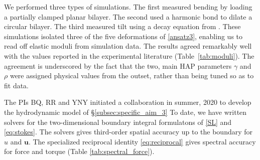 We performed three types of simulations. The first measured bending by loading
a partially clamped planar bilayer. The second used a harmonic bond to dilate a circular bilayer.
The third measured tilt using a decay equation from  \cite{KUZMIN2005}.
These simulations isolated three of the five deformations of \eqref{ansatz3}, enabling
us to read off elastic moduli from simulation data. The results agreed remarkably 
well with the values reported in the experimental literature 
(Table~\ref{tab:moduli}). The agreement is underscored by the fact
that the two, main HAP parameters $\gamma$ and $\rho$ were assigned
physical values from the outset, rather than being tuned so as to fit data. 

The PIs BQ, RR and YNY initiated a collaboration in summer, 2020 to develop
the hydrodynamic model of \S \ref{subsec:specific_aim_3}
To date, we have written solvers for the two-dimensional boundary integral formulatons
of \eqref{SL} and \eqref{eq:stokes}. The solvers gives third-order spatial accuracy
up to the boundary for $u$ and $\mathbf{u}$. The specialized reciprocal identity \ref{eq:reciprocal}
gives spectral accuracy for force and torque (Table \ref{tab:spectral_force}).
\begin{table}
\caption{\label{tab:spectral_force} 
\footnotesize 
Relative numerical errors
(rel. err.)$_F = \max_{i} \|\mathbf{F}_i-\mathbf{F}_i^{\text{exact}}\|/\|\mathbf{F}_i^{\text{exact}}\|$
and 
(rel. err.)$_G = \max_{i} \|\mathbf{G}_i-\mathbf{G}_i^{\text{exact}}\|/\|\mathbf{G}_i^{\text{exact}}\|$
for force and torque respectively as a function of number of grid points $n$ per particle.
The data is for $N = 5$ particles; two of the particles are nearly touching 
at a distance 1 \% of particle diameter.} 
\end{table}

